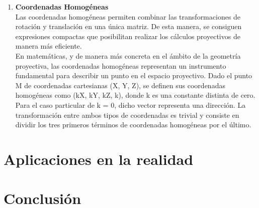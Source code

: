 \documentclass[a4,10pt]{article}
\begin{document}
\begin{enumerate}
\item \textbf{Coordenadas Homogéneas}\\
Las coordenadas homogéneas permiten combinar las transformaciones de rotación y translación en una única matriz. De esta manera, se consiguen expresiones compactas que posibilitan realizar los cálculos proyectivos de manera más eficiente.\\ 
En matemáticas, y de manera más concreta en el ámbito de la geometría proyectiva, las coordenadas homogéneas representan un instrumento fundamental para describir un punto en el espacio proyectivo. Dado el punto M de coordenadas cartesianas (X, Y, Z), se definen sus coordenadas homogéneas como (kX, kY, kZ, k), donde k es una constante distinta de cero. Para el caso particular de k = 0, dicho vector representa una dirección. La transformación entre ambos tipos de coordenadas es trivial y consiste en dividir los tres primeros términos de coordenadas homogéneas por el último.


\end{enumerate}

\section{Aplicaciones en la realidad}

 


\section{Conclusión}






\end{document}
